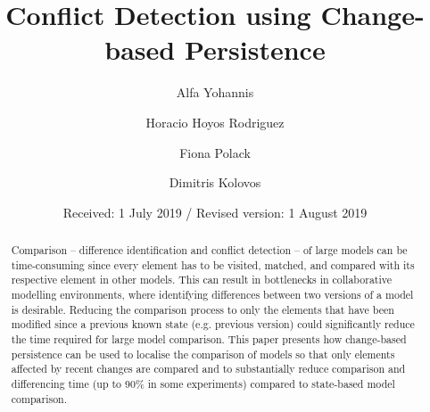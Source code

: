%
%

    
\renewcommand{\thelstlisting}{\arabic{lstlisting}}
\renewcommand{\labelitemi}{$\bullet$}
\newcommand{\AndA}{\textnormal{\textbf{and }}}
\newcommand{\Is}{\textnormal{\textbf{is }}}
\newcommand{\Not}{\textnormal{\textbf{not }}}
\newcommand{\In}{\textnormal{\textbf{in }}}
\newcommand{\Or}{\textnormal{\textbf{or }}}
\newcommand{\eqnum}{\refstepcounter{equation}\textup{\tagform@{\theequation}}}

%
\title{Conflict Detection using Change-based Persistence}
\author{Alfa Yohannis \and Horacio Hoyos Rodriguez \and Fiona Polack \and Dimitris Kolovos%
}                     %
%
\offprints{}          %
%
%
\date{Received: 1 July 2019 / Revised version: 1 August 2019}
%
\maketitle
%
\begin{abstract}
Comparison -- difference identification and conflict detection -- of large models can be time-consuming since every element has to be visited, matched, and compared with its respective element in other models. This can result in bottlenecks in collaborative modelling environments, where identifying differences between two versions of a model is desirable. Reducing the comparison process to only the elements that have been modified since a previous known state (e.g. previous version) could significantly reduce the time required for large model comparison. This paper presents how change-based persistence can be used to localise the comparison of models so that only elements affected by recent changes are compared and to substantially reduce comparison and differencing time (up to 90\% in some experiments) compared to state-based model comparison. 
\end{abstract}
%


